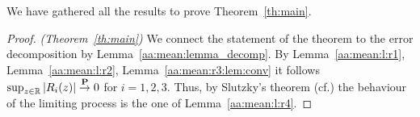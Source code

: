 We have gathered all the results to prove Theorem~\ref{th:main}.
\begin{proof}
  \emph{(Theorem~\ref{th:main})}
  We connect the statement of the theorem to the error decomposition by Lemma~\ref{aa:mean:lemma_decomp}.
  By Lemma~\ref{aa:mean:l:r1}, 
  Lemma~\ref{aa:mean:l:r2},
  Lemma~\ref{aa:mean:r3:lem:conv}
   it follows 
   $\sup_{z\in\mathbb{R}}|R_i(z)|\overset{\mathbf{P}}{\to}0$ for $i=1,2,3$.
   Thus, by Slutzky's theorem (cf.\cite[Theorem~13.18]{Klenke2020})
   the behaviour of the limiting process is the one of Lemma~\ref{aa:mean:l:r4}.
\end{proof}
